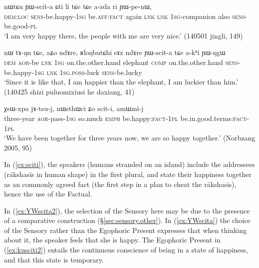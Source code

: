 \begin{exe}
\ex \label{ex:YWscita}
\gll nɯtɕu ɲɯ-scit-a ɕti li tɕe tɕe a-zda ri ɲɯ-pe-nɯ, \\
\textsc{dem}:\textsc{loc} \textsc{sens}-be.happy-\textsc{1sg} be.\textsc{aff}:\textsc{fact} again \textsc{lnk} \textsc{lnk} \textsc{1sg}-companion also \textsc{sens}-be.good-\textsc{pl} \\
\glt `I am very happy there, the people with me are very nice.' (140501 jingli, 149)
\end{exe}

\begin{exe}
\ex \label{ex:YWscita2}
\gll nɯ tɤ-ŋu tɕe, aʑo ndɤre, ʁloŋbutɕhi sɤz ndɤre ɲɯ-scit-a tɕe a-kʰi ɲɯ-ŋgɯ \\
\textsc{dem} \textsc{aor}-be \textsc{lnk} \textsc{1sg} on.the.other.hand elephant \textsc{comp} on.the.other.hand \textsc{sens}-be.happy-\textsc{1sg} \textsc{lnk} \textsc{1sg}.\textsc{poss}-luck \textsc{sens}-be.lucky \\
\glt `Since it is like that, I am happier than the elephant, I am luckier than him.' (140425 shizi puluomixiusi he daxiang, 41)
\end{exe}


\begin{exe}
\ex \label{ex:sciti}
\gll χsɯ-xpa jɤ-tsu-j, nɯsthɯci ʑo scit-i, amɯmi-j  \\
three-year \textsc{aor}-pass-\textsc{1sg} so.much \textsc{emph} be.happy:\textsc{fact}-\textsc{1pl} be.in.good.terms:\textsc{fact}-\textsc{1pl} \\
\glt `We have been together for three years now, we are so happy together.' (Norbzang 2005, 95)
\end{exe}

In (\ref{ex:sciti}), the speakers (humans stranded on an island) include the addressees (rākshasīs in human shape) in the first plural, and state their happiness together as an commonly agreed fact (the first step in a plan to cheat the rākshasīs), hence the use of the Factual. 

In (\ref{ex:YWscita2}), the selection of the Sensory here may be due to the presence of a comparative construction (§\ref{sec:sensory.other}). In (\ref{ex:YWscita}) the choice of the Sensory rather than the Egophoric Present expresses that when thinking about it, the speaker feels that she is happy. The Egophoric Present in (\ref{ex:kusciti2}) entails the continuous conscience of being in a state of happiness, and that this state is temporary.

